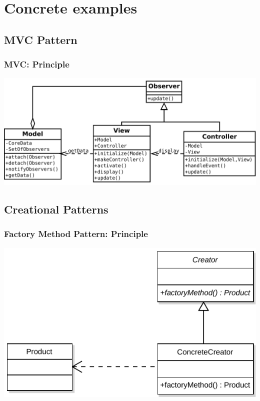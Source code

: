 \documentclass{beamer}
\begin{document}
\section{Concrete examples}

\subsection{MVC Pattern}
\begin{frame}
\frametitle{MVC: Principle}
\begin{center}
   \includegraphics[width=\textwidth]{MVC.pdf}
\end{center}
\end{frame} 

\subsection{Creational Patterns}
\begin{frame}
\frametitle{Factory Method Pattern: Principle}
\begin{center}
   \includegraphics[width=\textwidth]{FactoryMethod.pdf}
\end{center}
\end{frame} 
\end{document}
